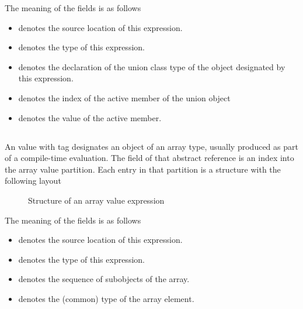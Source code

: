 The meaning of the fields is as follows
\begin{itemize}
	\item {} denotes the source location of this expression.
	\item {} denotes the type of this expression.
	\item {} denotes the declaration of the union class type of the object designated by this expression.
	\item {} denotes the index of the active member of the union object
	\item {} denotes the value of the active member.
\end{itemize}




\subsection{}
\label{sec:ifc:ExprSort:SubobjectValue}




\subsection{}
\label{sec:ifc:ExprSort:ArrayValue}

An  value with tag  designates an object of an array type, usually produced as part of a compile-time evaluation.
The  field of that abstract reference is an index into the array value partition.  Each entry in that partition is a structure with the following layout
%
\begin{figure}[H]
	\centering
	\caption{Structure of an array value expression}
	\label{fig:ifc:ExprSort:ArrayValue}
\end{figure}
%
The meaning of the fields is as follows
\begin{itemize}
	\item {} denotes the source location of this expression.
	\item {} denotes the type of this expression.
	\item {} denotes the sequence of subobjects of the array.
	\item {} denotes the (common) type of the array element.
\end{itemize}


